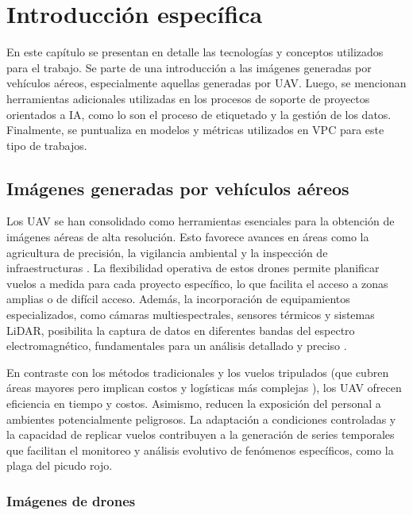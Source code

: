\chapter{Introducción específica}
\label{Chapter2}

En este capítulo se presentan en detalle las tecnologías y conceptos utilizados para el trabajo. Se parte de una introducción a las imágenes generadas por vehículos aéreos, especialmente aquellas generadas por UAV. Luego, se mencionan herramientas adicionales utilizadas en los procesos de soporte de proyectos orientados a IA, como lo son el proceso de etiquetado y la gestión de los datos. Finalmente, se puntualiza en modelos y métricas utilizados en VPC para este tipo de trabajos.

\section{Imágenes generadas por vehículos aéreos}
\label{sec:imgGenVehiculosAereos}

Los UAV se han consolidado como herramientas esenciales para la obtención de imágenes aéreas de alta resolución. Esto favorece avances en áreas como la agricultura de precisión, la vigilancia ambiental y la inspección de infraestructuras \citep{mokhtar_image_2023}. La flexibilidad operativa de estos drones permite planificar vuelos a medida para cada proyecto específico, lo que facilita el acceso a zonas amplias o de difícil acceso. Además, la incorporación de equipamientos especializados, como cámaras multiespectrales, sensores térmicos y sistemas LiDAR, posibilita la captura de datos en diferentes bandas del espectro electromagnético, fundamentales para un análisis detallado y preciso \citep{unmanned_system_technology_uavdrone_nodate}.

En contraste con los métodos tradicionales y los vuelos tripulados (que cubren áreas mayores pero implican costos y logísticas más complejas \citep{2000_aviation_ortoimagenes_nodate}), los UAV ofrecen eficiencia en tiempo y costos. Asimismo, reducen la exposición del personal a ambientes potencialmente peligrosos. La adaptación a condiciones controladas y la capacidad de replicar vuelos contribuyen a la generación de series temporales que facilitan el monitoreo y análisis evolutivo de fenómenos específicos, como la plaga del picudo rojo.

\subsection{Imágenes de drones}
\label{sec:imgUavDrones}

